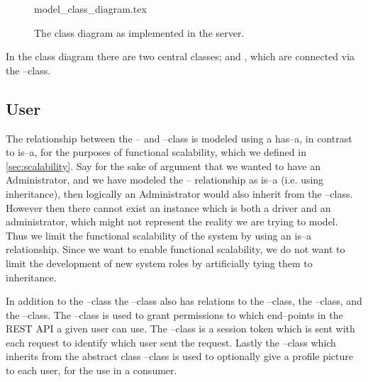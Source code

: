 \begin{figure}[p]
    \begin{center}
        {model_class_diagram.tex}
        \caption{The class diagram as implemented in the server.}\label{fig:model_class_diagram}
    \end{center}
\end{figure}

In the class diagram there are two central classes;  and , which are connected via the --class.
\subsection{User}
The relationship between the -- and --class is modeled using a has--a, in contrast to is--a, for the purposes of functional scalability, which we defined in \cref{sec:scalability}.
Say for the sake of argument that we wanted to have an Administrator, and we have modeled the -- relationship as is--a (i.e. using inheritance), 
then logically an Administrator would also inherit from the --class.
However then there cannot exist an instance which is both a driver and an administrator, which might not represent the reality we are trying to model. 
Thus we limit the functional scalability of the system by using an is--a relationship. 
Since we want to enable functional scalability, we do not want to limit the development of new system roles by artificially tying them to inheritance.

In addition to the --class the --class also has relations to the --class, the --class, and the --class.
The --class is used to grant permissions to which end--points in the REST API a given user can use. 
The --class is a session token which is sent with each request to identify which user sent the request. 
Lastly the --class which inherits from the abstract class --class is used to optionally give a profile picture to each user, for the use in a consumer. 

